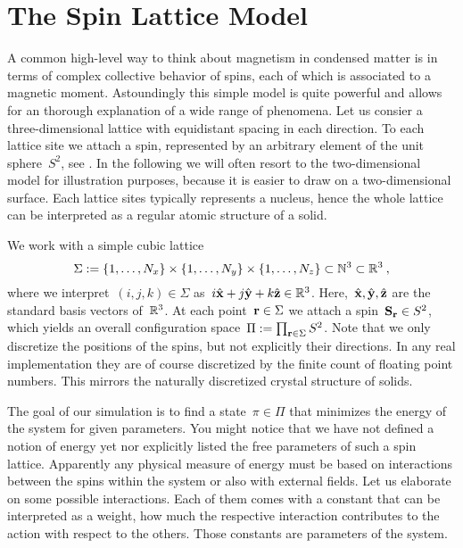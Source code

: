 \section{The Spin Lattice Model}\label{sec:model}
%
A common high-level way to think about magnetism in condensed matter is in terms
of complex collective behavior of spins, each of which is associated to a
magnetic moment. Astoundingly this simple model is quite powerful and allows for
an thorough explanation of a wide range of phenomena. Let us consier a
three-dimensional lattice with equidistant spacing in each direction. To each
lattice site we attach a spin, represented by an arbitrary element of the unit
sphere~$S^2$, see . In the following we will often resort to
the two-dimensional model for illustration purposes, because it is easier to
draw on a two-dimensional surface. Each lattice sites typically represents a
nucleus, hence the whole lattice can be interpreted as a regular atomic
structure of a solid.

We work with a simple cubic lattice
%
\begin{equation}
  \Sigma := \{1,\dots,N_x\} \times \{1,\dots,N_y\} \times
  \{1,\dots,N_z\} \subset \mathbb{N}^3 \subset \mathbb{R}^3\:,
\end{equation}
%
where we interpret~$(i,j,k) \in \Sigma$ as~$i \hat{\mathbf{x}} + j \hat{\mathbf{y}} + k \hat{\mathbf{z}}
\in \mathbb{R}^3$. Here,~$\hat{\mathbf{x}}, \hat{\mathbf{y}}, \hat{\mathbf{z}}$ are the standard basis vectors
of~$\mathbb{R}^3$. At each point~$\mathbf{r} \in \Sigma$ we attach a spin~$\mathbf{S}_{\mathbf{r}} \in S^2$,
which yields an overall configuration space~$\Pi := \prod_{\mathbf{r} \in \Sigma} S^2$.
Note that we only discretize the positions of the spins, but not explicitly
their directions.  In any real implementation they are of course discretized by
the finite count of floating point numbers. This mirrors the naturally
discretized crystal structure of solids.


The goal of our simulation is to find a state~$\pi \in \Pi$ that minimizes the
energy of the system for given parameters. You might notice that we have not
defined a notion of energy yet nor explicitly listed the free parameters of such
a spin lattice. Apparently any physical measure of energy must be based on
interactions between the spins within the system or also with external fields.
Let us elaborate on some possible interactions. Each of them comes with a
constant that can be interpreted as a weight, \ie{} how much the respective
interaction contributes to the action with respect to the others. Those
constants are parameters of the system.

